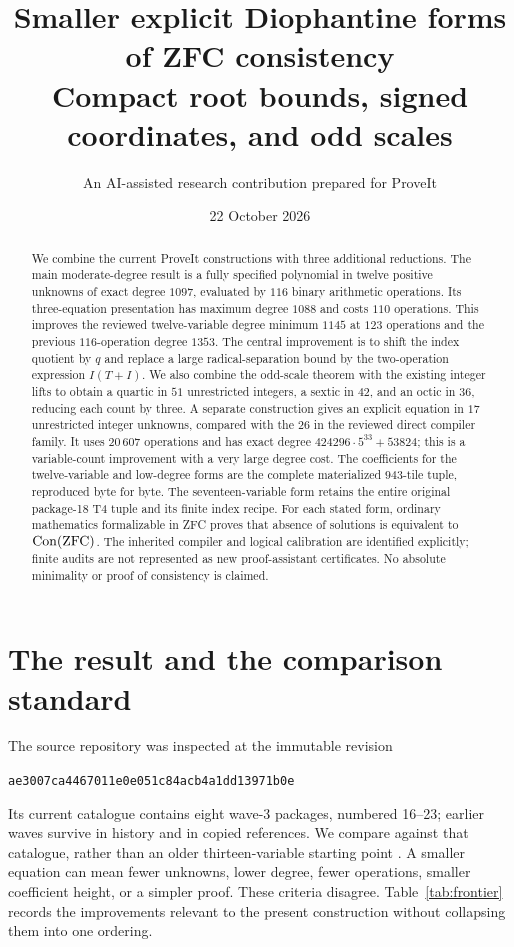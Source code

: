 \documentclass[11pt]{article}
\title{\textbf{Smaller explicit Diophantine forms\\of ZFC consistency}\\[5pt]
\large Compact root bounds, signed coordinates, and odd scales}
\author{An AI-assisted research contribution prepared for ProveIt}
\date{22 October 2026}
\theoremstyle{remark}\newtheorem{remark}[theorem]{Remark}
\newcommand{\pin}{\texttt{ae3007ca4467011e0e051c84acb4a1dd13971b0e}}
\begin{document}
\maketitle
\begin{abstract}
We combine the current ProveIt constructions with three additional reductions.
The main moderate-degree result is a fully specified polynomial in twelve
positive unknowns of exact degree $1097$, evaluated by $116$ binary arithmetic
operations. Its three-equation presentation has maximum degree $1088$ and costs
$110$ operations. This improves the reviewed twelve-variable degree minimum
$1145$ at $123$ operations and the previous $116$-operation degree $1353$.
The central improvement is to shift the index quotient by $q$ and replace a
large radical-separation bound by the two-operation expression $I(T+I)$.
We also combine the odd-scale theorem with the existing integer lifts to
obtain a quartic in $51$ unrestricted integers, a sextic in $42$, and an octic
in $36$, reducing each count by three. A separate construction gives an
explicit equation in $17$ unrestricted integer unknowns, compared with the
$26$ in the reviewed direct compiler family. It uses $20\,607$ operations
and has exact degree $424296\cdot5^{33}+53824$; this is a variable-count
improvement with a very large degree cost.
The coefficients for the twelve-variable and low-degree forms are the complete
materialized $943$-tile tuple, reproduced byte for byte. The seventeen-variable
form retains the entire original package-18 T4 tuple and its finite index recipe.
For each stated form, ordinary mathematics formalizable in ZFC proves that
absence of solutions is equivalent to $\operatorname{Con}(\mathrm{ZFC})$. The inherited
compiler and logical calibration are identified explicitly; finite audits are
not represented as new proof-assistant certificates. No absolute minimality
or proof of consistency is claimed.
\end{abstract}
\clearpage
\tableofcontents
\newpage

\section{The result and the comparison standard}
\label{sec:results}

The source repository was inspected at the immutable revision
\begin{center}\small\pin\end{center}
Its current catalogue contains eight wave-3 packages, numbered 16--23; earlier
waves survive in history and in copied references. We compare against that
catalogue, rather than an older thirteen-variable starting point
\cite{catalogue}. A smaller equation can mean fewer unknowns, lower degree,
fewer operations, smaller coefficient height, or a simpler proof. These
criteria disagree. Table~\ref{tab:frontier} records the improvements relevant
to the present construction without collapsing them into one ordering.
\end{document}
